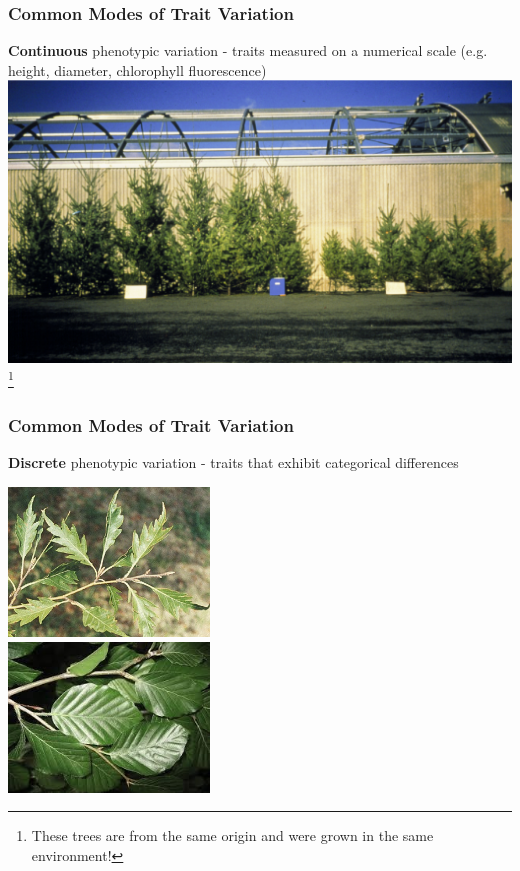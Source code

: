 \documentclass{beamer}
\newcommand\blfootnote[1]{%
	\begingroup
	\renewcommand\thefootnote{}\footnote{#1}%
	\addtocounter{footnote}{-1}%
	\endgroup
}
\begin{document}
\begin{frame}
	
	\frametitle{Common Modes of Trait Variation}
	
		\textbf{Continuous} phenotypic variation - traits measured on a numerical scale (e.g. height, diameter, chlorophyll fluorescence) 
				\centering \includegraphics[keepaspectratio, width  = \textwidth]{img/treeVariation}\\

	
	
\blfootnote{These trees are from the same origin and were grown in the same environment!}
\end{frame}


\begin{frame}
	
	\frametitle{Common Modes of Trait Variation}

		\textbf{Discrete} phenotypic variation - traits that exhibit categorical differences \\
			\vspace{10pt}

		\centering \includegraphics[keepaspectratio, width  = 0.4\textwidth]{img/cutBeechLeaf}\\
		\centering \includegraphics[keepaspectratio, width  = 0.4\textwidth]{img/roundBeechLeaf}\\
		
	
\end{frame}
\end{document}
